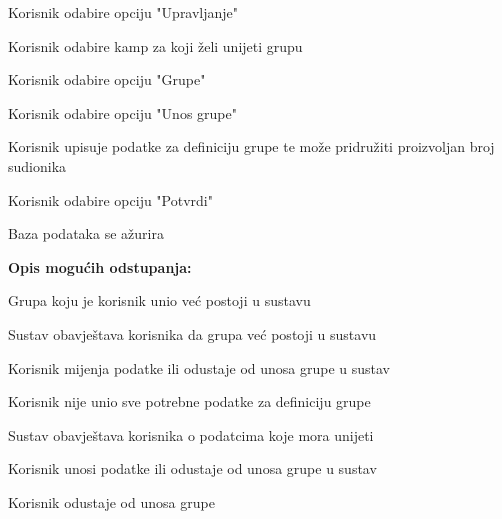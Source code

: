 \begin{packed_item}
\begin{packed_item}
						\item[] \begin{packed_enum}
							
							
							\item Korisnik odabire opciju "Upravljanje"
							\item Korisnik odabire kamp za koji želi unijeti grupu
							\item Korisnik odabire opciju "Grupe"
							\item Korisnik odabire opciju "Unos grupe"
							\item Korisnik upisuje podatke za definiciju grupe te može pridružiti proizvoljan broj sudionika 
							\item Korisnik odabire opciju "Potvrdi"
							\item Baza podataka se ažurira
						\end{packed_enum}
						
						\item  \textbf{Opis mogućih odstupanja:}
						
						\item[] \begin{packed_item}
							
							\item[6.a] Grupa koju je korisnik unio već postoji u sustavu
							\item[] \begin{packed_enum}
								
								\item Sustav obavještava korisnika da grupa već postoji u sustavu
								\item Korisnik mijenja podatke ili odustaje od unosa grupe u sustav 
								
								
							\end{packed_enum}
							\item[6.b] Korisnik nije unio sve potrebne podatke za definiciju grupe
							\item[] \begin{packed_enum}
								
								\item Sustav obavještava korisnika o podatcima koje mora unijeti
								\item Korisnik unosi podatke ili odustaje od unosa grupe u sustav
								
							\end{packed_enum}
							\item[3.a] Korisnik odustaje od unosa grupe
							\item[] \begin{packed_enum}
								

\end{packed_enum}
\end{packed_item}
\end{packed_item}
\end{packed_item}
